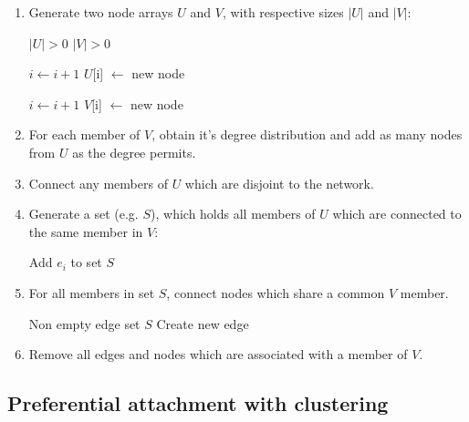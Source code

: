 \documentclass[a4paper,11pt,titlepage]{article}
\begin{document}
\begin{enumerate}
  \item Generate two node arrays $U$ and $V$, with respective
        sizes $|U|$ and $|V|$:

    \begin{algorithmic}
      \REQUIRE $|U| > 0$
      \REQUIRE $|V| > 0$

        \STATE $i \gets i + 1$
        \STATE $U$[i] $\gets$ new node
      \ENDFOR

        \STATE $i \gets i + 1$
        \STATE $V$[i] $\gets$ new node
      \ENDFOR
    \end{algorithmic}

  \item For each member of $V$, obtain it's degree distribution
        and add as many nodes from $U$ as the degree permits.

  \item Connect any members of $U$ which are disjoint to the network.

  \item Generate a set (e.g. $S$), which holds all members of
        $U$ which are connected to the same member in $V$:

  \begin{algorithmic}
        \STATE Add $e_i$ to set $S$
      \ENDIF
    \ENDFOR
  \end{algorithmic}

  \item For all members in set $S$, connect nodes which share
        a common $V$ member.

  \begin{algorithmic}
    \REQUIRE Non empty edge set $S$
          \STATE Create new edge
        \ENDIF
      \ENDFOR
    \ENDFOR
  \end{algorithmic}

  \item Remove all edges and nodes which are associated with
        a member of $V$.

\end{enumerate}

\subsection{Preferential attachment with clustering}
\end{document}
